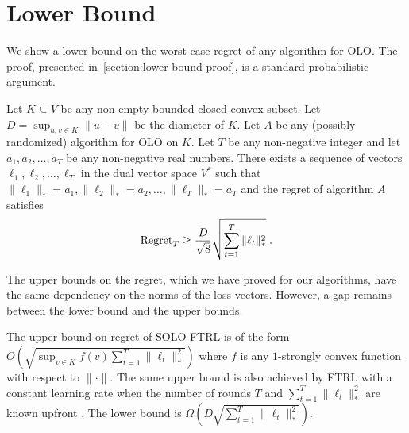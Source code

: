 \section{Lower Bound}
\label{section:lower-bound}

We show a lower bound on the worst-case regret of any algorithm for OLO. The
proof, presented in~\ref{section:lower-bound-proof}, is a standard
probabilistic argument.

\begin{theorem}
\label{theorem:simple-lower-bound}
Let $K \subseteq V$ be any non-empty bounded closed convex subset. Let $D =
\sup_{u,v \in K} \|u - v\|$ be the diameter of $K$. Let $A$ be any (possibly
randomized) algorithm for OLO on $K$. Let $T$ be any non-negative integer and
let $a_1, a_2, \dots, a_T$ be any non-negative real numbers.  There exists a
sequence of vectors $\ell_1, \ell_2, \dots, \ell_T$ in the dual vector space
$V^*$ such that $\|\ell_1\|_* = a_1, \|\ell_2\|_* = a_2, \dots, \|\ell_T\|_* =
a_T$ and the regret of algorithm $A$ satisfies
\begin{equation}
\label{equation:simple-lower-bound}
\operatorname{Regret}_T \ge \frac{D}{\sqrt{8}} \sqrt{\sum_{t=1}^T\|\ell_t\|_*^2} \; .
\end{equation}
\end{theorem}

The upper bounds on the regret, which we have proved for our algorithms, have
the same dependency on the norms of the loss vectors.  However, a gap remains
between the lower bound and the upper bounds.

The upper bound on regret of \textsc{SOLO FTRL} is of
the form $O(\sqrt{\sup_{v \in K} f(v) \sum_{t=1}^T \|\ell_t\|_*^2})$ where $f$
is any $1$-strongly convex function with respect to $\|\cdot\|$.  The same
upper bound is also achieved by \textsc{FTRL} with a constant learning rate
when the number of rounds $T$ and $\sum_{t=1}^T \|\ell_t\|_*^2$ are known
upfront \cite[Chapter 2]{Shalev-Shwartz-2011}.  The lower bound is
$\Omega(D\sqrt{\sum_{t=1}^T \|\ell_t\|_*^2})$.

